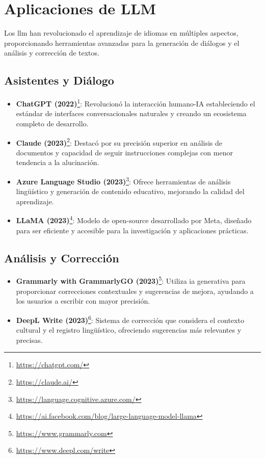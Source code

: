 \section{Aplicaciones de LLM}

Los \gls{llm} han revolucionado el aprendizaje de idiomas en múltiples aspectos, proporcionando herramientas avanzadas para la generación de diálogos y el análisis y corrección de textos.

\subsection{Asistentes y Diálogo}
\begin{itemize}
  \item \textbf{ChatGPT (2022)}\footnote{\url{https://chatgpt.com/}}: Revolucionó la interacción humano-IA estableciendo el estándar de interfaces conversacionales naturales y creando un ecosistema completo de desarrollo.
  \item \textbf{Claude (2023)}\footnote{\url{https://claude.ai/}}: Destacó por su precisión superior en análisis de documentos y capacidad de seguir instrucciones complejas con menor tendencia a la alucinación.
  \item \textbf{Azure Language Studio (2023)}\footnote{\url{https://language.cognitive.azure.com/}}: Ofrece herramientas de análisis lingüístico y generación de contenido educativo, mejorando la calidad del aprendizaje.
  \item \textbf{LLaMA (2023)}\footnote{\url{https://ai.facebook.com/blog/large-language-model-llama}}: Modelo de \gls{open-source} desarrollado por Meta, diseñado para ser eficiente y accesible para la investigación y aplicaciones prácticas.
\end{itemize}

\subsection{Análisis y Corrección}

\begin{itemize}
  \item \textbf{Grammarly with GrammarlyGO (2023)}\footnote{\url{https://www.grammarly.com}}: Utiliza \gls{ia} generativa para proporcionar correcciones contextuales y sugerencias de mejora, ayudando a los usuarios a escribir con mayor precisión.
  \item \textbf{DeepL Write (2023)}\footnote{\url{https://www.deepl.com/write}}: Sistema de corrección que considera el contexto cultural y el registro lingüístico, ofreciendo sugerencias más relevantes y precisas.
\end{itemize}


